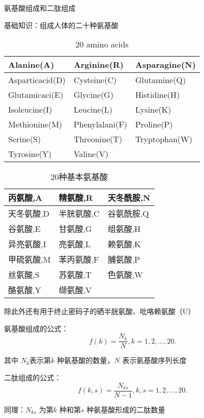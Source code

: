 \begin{notation}
    氨基酸组成和二肽组成

    基础知识：组成人体的二十种氨基酸
\end{notation}
\begin{table}[htpb]
    \centering
    \caption{20 amino acids}
    \label{tab:20-amino-acids}
    \begin{tabular}{|l|l|l|}
    \hline
    Alanine(A) & Arginine(R) & Asparagine(N) \\
    \hline
    Asparticacid(D) & Cysteine(C) & Glutamine(Q) \\
    \hline
    Glutamicaci(E) & Glycine(G) & Histidine(H) \\
    \hline
    Isoleucine(I) & Leucine(L) & Lysine(K) \\
    \hline
    Methionine(M) & Phenylalani(F) & Proline(P) \\
    \hline
    Serine(S) & Threonine(T) & Tryptophan(W) \\
    \hline
    Tyrosine(Y) & Valine(V) & \\
    \hline
    \end{tabular}
\end{table}
\begin{table}[htpb]
    \centering
    \caption{20种基本氨基酸}
    \label{tab:20种基本氨基酸}
    \begin{tabular}{|l|l|l|}
    \hline
    丙氨酸,A & 精氨酸,R & 天冬酰胺,N \\
    \hline
    天冬氨酸,D & 半胱氨酸,C & 谷氨酰胺,Q \\
    \hline
    谷氨酸,E & 甘氨酸,G & 组氨酸,H \\
    \hline
    异亮氨酸,I & 亮氨酸,L & 赖氨酸,K \\
    \hline
    甲硫氨酸,M & 苯丙氨酸,F & 脯氨酸,P \\
    \hline
    丝氨酸,S & 苏氨酸,T & 色氨酸,W \\
    \hline
    酪氨酸,Y & 缬氨酸,V & \\
    \hline
    \end{tabular}
\end{table}
除此外还有用于终止密码子的硒半胱氨酸、吡咯赖氨酸（U）
\begin{notation}
    氨基酸组成的公式：
    \[
        f\left( k \right) =\frac{N_k}{N},k=1,2,\ldots,20
    .\] 

    其中 $N_k$表示第$k$ 种氨基酸的数量，$N$ 表示氨基酸序列长度
\end{notation}
\begin{notation}
    二肽组成的公式：
    \[
        f\left( k,s \right) =\frac{N_{ks}}{N-1},k,s=1,2,\ldots,20
    .\] 
    
    同理：$N_{ks}$ 为第$k$ 种和第$s$ 种氨基酸形成的二肽数量
\end{notation}
